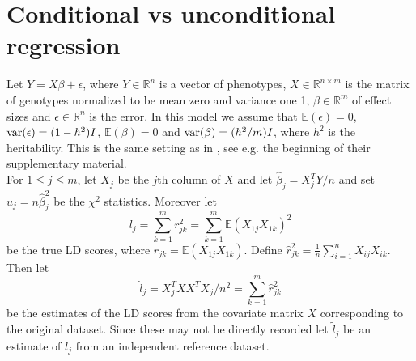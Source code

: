 \section{Conditional vs unconditional regression}
Let $ Y = X\beta + \epsilon$, where $ Y \in \mathbb{R}^n$ is a vector of phenotypes, $ X \in \mathbb{R}^{n\times m}$ is the matrix of genotypes normalized to be mean zero and variance one 1, $ \beta \in \mathbb{R}^m$ of effect sizes and $ \epsilon \in \mathbb{R}^n$ is the error. In this model we assume that $ \mathbb{E}(\epsilon) = 0  $, $ \text{var}(\epsilon) = (1-h^2)I $, $ \mathbb{E}(\beta)  = 0$ and $  \text{var}(\beta) = (h^2/m)I $, where $ h^2 $ is the heritability. This is the same setting as in  \cite{Bulik2015}, see e.g. the beginning of their supplementary material.\\

\noindent For $ 1\leq j \leq m $, let $ X_j $ be the $ j $th column of $ X $ and let $ \hat{\beta}_j = X_j^TY/n $ and set $ u_j = n\hat{\beta}_j^2 $ be the $ \chi^2 $ statistics. Moreover let
\begin{equation*}
	l_j = \sum_{k = 1}^m r^2_{jk}  = \sum_{k = 1}^m \mathbb{E}(X_{1j}X_{1k})^2
\end{equation*}
be the true LD scores, where $ r_{jk} = \mathbb{E}(X_{1j}X_{1k}) $. Define $ \hat{r}^2_{jk} = \frac{1}{n}\sum_{i = 1}^n X_{ij}X_{ik} $. Then let
\begin{equation*}
	\hat{l}_j = X_j^TXX^TX_j/n^2 = \sum_{k = 1}^m \hat{r}^2_{jk} 
\end{equation*}
be the estimates of the LD scores from the covariate matrix $ X $ corresponding to the original dataset. Since these may not be directly recorded let $ \tilde{l}_j $ be an estimate of $ l_j $ from an independent reference dataset. 

